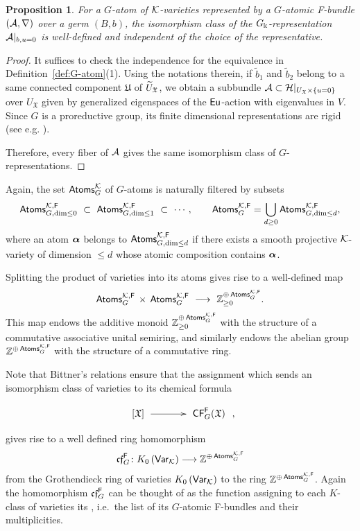 \documentclass[twoside,leqno]{article}
\numberwithin{equation}{section}
\theoremstyle{plain}
\newtheorem{proposition}[equation]{Proposition}
\theoremstyle{definition}
\begin{document}
\begin{proposition} \label{prop:iso_of_representations}
  For a $G$-atom of $\mathcal K$-varieties represented by a $G$-atomic F-bundle $(\mathcal A,\nabla)$ over a germ $(B, b)$, the isomorphism class of the $G_{\Bbbk}$-representation $\mathcal A|_{b,u=0}$ is well-defined and independent of the choice of the representative.
\end{proposition}
\begin{proof}
  It suffices to check the independence for the equivalence in Definition~\ref{def:G-atom}(1).
  Using the notations therein, if $\tilde b_1$ and $\tilde b_2$ belong to a same connected component $\mathfrak{U}$ of $\widetilde U_{\mathfrak{X}}$, we obtain a subbundle $\mathcal A \subset \mathcal H|_{U_{\mathfrak{X}}\times \{u=0\}}$ over $U_{\mathfrak{X}}$ given by generalized eigenspaces of the $\operatorname{\mathsf{Eu}}$-action with eigenvalues in $V$.
  Since $G$ is a proreductive group, its finite dimensional representations are rigid (see e.g. \cite[Proposition~15.15]{milne-AG}).
  
  Therefore, every fiber of $\mathcal A$ gives the same isomorphism class of $G$-representations.
\end{proof}

\medskip


Again, the set $\mathsf{Atoms}_{G}^{\mathcal K}$ of $G$-atoms is naturally filtered by subsets
\[\mathsf{Atoms}_{G,\dim \leq 0}^{\kay,\mathsf{F}} 
\ \subset \ \mathsf{Atoms}_{G,\dim \leq 1}^{\kay,\mathsf{F}} \ \subset \ \cdots,  \qquad 
\mathsf{Atoms}_{G}^{\kay,\mathsf{F}}=\bigcup_{d\geq 0}\mathsf{Atoms}_{G,\dim \leq d}^{\kay,\mathsf{F}},
\]
where an atom $\boldsymbol{\alpha}$ belongs to  $\mathsf{Atoms}_{G,\dim \leq d}^{\mathcal K,\mathsf{F}}$ if there exists 
a smooth projective $\mathcal K$-variety of dimension $\leq d$ whose atomic composition contains $\boldsymbol{\alpha}$. 

\medskip


Splitting the  product of varieties into its atoms gives rise to a 
well-defined map
\[
\Atoms^{\kay,\mathsf{F}}_{G} \, \times \, \Atoms^{\kay,\mathsf{F}}_{G} \ 
\longrightarrow  \ \bbZ^{\oplus \, \Atoms^{\kay,\mathsf{F}}_{G}}_{\ge 0}.
\]
This map endows the additive monoid $\mathbb Z^{\oplus \, \mathsf{Atoms}^{\mathcal K,\mathsf{F}}_{G}}_{\ge 0}$
with the structure of a commutative associative unital semiring, and similarly endows the abelian group 
$\mathbb Z^{\oplus \, \mathsf{Atoms}^{\mathcal K,\mathsf{F}}_{G}}$
with the structure of a commutative ring.


\medskip


Note that Bittner's  relations \cite{Bittner} ensure  that the 
assignment which sends an isomorphism class of varieties to its chemical formula
\[
\xymatrix@1@C+1pc@M+0.5pc{[\mathfrak{X}]\ar[r] & \CF_{G}^{\mathsf{F}}(\mathfrak{X})},
\]
gives rise to a well defined ring 
homomorphism 
\[
\mathfrak{cf}_{G}^{\mathsf{F}} \colon K_0\left(\mathsf{Var}_{\mathcal K}\right) \longrightarrow  \mathbb Z^{\oplus \, \mathsf{Atoms}^{\mathcal K,\mathsf{F}}_{G}}
\]
from the Grothendieck ring of varieties $K_0\left(\mathsf{Var}_{\mathcal K}\right)$ to the ring 
$\mathbb Z^{\oplus \, \mathsf{Atoms}^{\mathcal K,\mathsf{F}}_{G}}$.
Again the homomorphism $\mathfrak{cf}_{G}^{\mathsf{F}}$ can be thought of as the function assigning to each $K$-class of varieties its , i.e.\ the list of its $G$-atomic F-bundles and their multiplicities.
\end{document}

